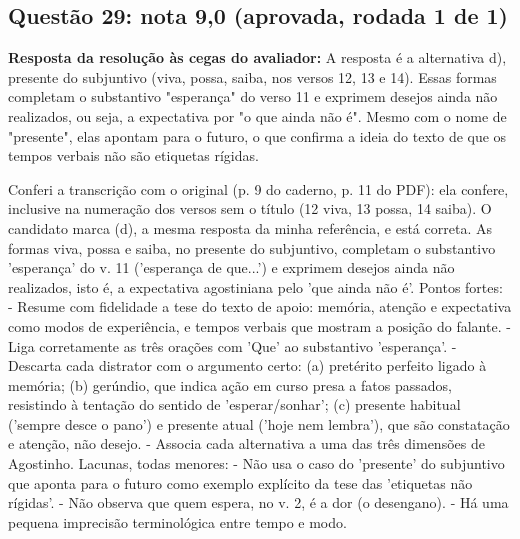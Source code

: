 \documentclass{article}%
\begin{document}
\subsection*{Questão 29: nota 9,0 (aprovada, rodada 1 de 1)}%
\textbf{Resposta da resolução às cegas do avaliador:} A resposta é a alternativa d), presente do subjuntivo (viva, possa, saiba, nos versos 12, 13 e 14). Essas formas completam o substantivo "esperança" do verso 11 e exprimem desejos ainda não realizados, ou seja, a expectativa por "o que ainda não é". Mesmo com o nome de "presente", elas apontam para o futuro, o que confirma a ideia do texto de que os tempos verbais não são etiquetas rígidas.\par %
Conferi a transcrição com o original (p. 9 do caderno, p. 11 do PDF): ela confere, inclusive na numeração dos versos sem o título (12 viva, 13 possa, 14 saiba). O candidato marca (d), a mesma resposta da minha referência, e está correta. As formas viva, possa e saiba, no presente do subjuntivo, completam o substantivo 'esperança' do v. 11 ('esperança de que...') e exprimem desejos ainda não realizados, isto é, a expectativa agostiniana pelo 'que ainda não é'.\newline%
\newline%
Pontos fortes:\newline%
{-} Resume com fidelidade a tese do texto de apoio: memória, atenção e expectativa como modos de experiência, e tempos verbais que mostram a posição do falante.\newline%
{-} Liga corretamente as três orações com 'Que' ao substantivo 'esperança'.\newline%
{-} Descarta cada distrator com o argumento certo: (a) pretérito perfeito ligado à memória; (b) gerúndio, que indica ação em curso presa a fatos passados, resistindo à tentação do sentido de 'esperar/sonhar'; (c) presente habitual ('sempre desce o pano') e presente atual ('hoje nem lembra'), que são constatação e atenção, não desejo.\newline%
{-} Associa cada alternativa a uma das três dimensões de Agostinho.\newline%
\newline%
Lacunas, todas menores:\newline%
{-} Não usa o caso do 'presente' do subjuntivo que aponta para o futuro como exemplo explícito da tese das 'etiquetas não rígidas'.\newline%
{-} Não observa que quem espera, no v. 2, é a dor (o desengano).\newline%
{-} Há uma pequena imprecisão terminológica entre tempo e modo.\newline%
\end{document}
